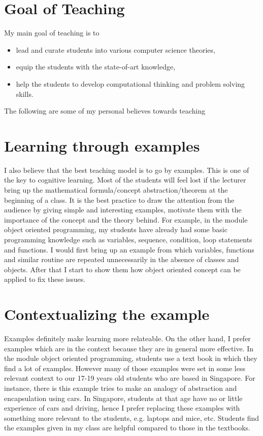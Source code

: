 \documentclass[12pt]{article}
\theoremstyle{plain} \numberwithin{equation}{section}
\theoremstyle{definition}
\begin{document}
\raisebox{1cm}

\section{Goal of Teaching}
My main goal of teaching is to
\begin{itemize}
   \item lead and curate students into various computer science theories,
   \item equip the students with the state-of-art knowledge,
   \item help the students to develop computational thinking and problem solving skills. 
\end{itemize}
%
The following are some of my personal believes towards teaching

\section{Learning through examples}
I also believe that the best teaching model is to go by examples.
This is one of the key to cognitive learning. Most of the students will
feel lost if the lecturer bring up the mathematical formula/concept abstraction/theorem
at the beginning of a class. It is the best practice to draw the attention
from the audience by giving simple and interesting examples, motivate them with 
the importance of the concept and the theory behind. For example, in
the module object oriented programming, my students have already had some basic programming knowledge such as variables,
sequence, condition, loop statements and functions. I would first
bring up an example from which variables, functions and similar routine are
repeated unnecessarily in the absence of classes and objects. After
that I start to show them how object oriented concept can be applied
to fix these issues.

\section{Contextualizing the example}
Examples definitely make learning more relateable. On the other hand,
I prefer examples which are in the context because they are in general
more effective. In the module object oriented programming, students
use a text book in which they find a lot of examples. However many of
those examples were set in some less relevant context to our 17-19
years old students who are based in Singapore. For instance, there is
this example tries to make an analogy of abstraction and encapsulation
using cars. In Singapore, students at that age have no or little
experience of cars and driving, hence I prefer replacing these
examples with something more relevant to the students, e.g. laptops
and mice, etc. Students find the examples given in my class are
helpful compared to those in the textbooks.
\end{document}
